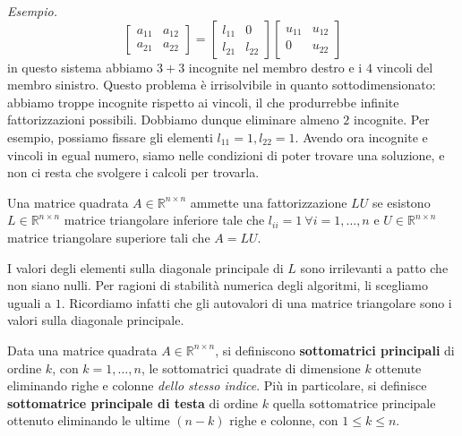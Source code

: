 \textit{Esempio.}
\begin{equation*}
\begin{bmatrix}
a_{11} & a_{12}\\
a_{21} & a_{22}
\end{bmatrix} =\begin{bmatrix}
l_{11} & 0\\
l_{21} & l_{22}
\end{bmatrix}\begin{bmatrix}
u_{11} & u_{12}\\
0 & u_{22}
\end{bmatrix}
\end{equation*}
in questo sistema abbiamo $\displaystyle 3+3$ incognite nel membro destro e i $\displaystyle 4$ vincoli del membro sinistro. Questo problema è irrisolvibile in quanto sottodimensionato: abbiamo troppe incognite rispetto ai vincoli, il che produrrebbe infinite fattorizzazioni possibili.
Dobbiamo dunque eliminare almeno $2$ incognite.
Per esempio, possiamo fissare gli elementi $\displaystyle l_{11} =1,l_{22} =1$.
Avendo ora incognite e vincoli in egual numero, siamo nelle condizioni di poter trovare una soluzione, e non ci resta che svolgere i calcoli per trovarla.
\begin{definition}
Una matrice quadrata $\displaystyle A\in \mathbb{R}^{n\times n}$ ammette una fattorizzazione $\displaystyle LU$ se esistono $\displaystyle L\in \mathbb{R}^{n\times n}$ matrice triangolare inferiore tale che $\displaystyle l_{ii} =1\ \forall i=1,\dotsc ,n$ e $\displaystyle U\in \mathbb{R}^{n\times n}$ matrice triangolare superiore tali che $\displaystyle A=LU$.
\end{definition}
I valori degli elementi sulla diagonale principale di $\displaystyle L$ sono irrilevanti a patto che non siano nulli.
Per ragioni di stabilità numerica degli algoritmi, li scegliamo uguali a $\displaystyle 1$.
Ricordiamo infatti che gli autovalori di una matrice triangolare sono i valori sulla diagonale principale.
\begin{definition}
Data una matrice quadrata $A \in \mathbb{R}^{n\times n}$, si definiscono \textbf{sottomatrici principali} di ordine $k$, con $k=1,\dots,n$, le sottomatrici quadrate di dimensione $k$ ottenute eliminando righe e colonne \emph{dello stesso indice}. Più in particolare, si definisce \textbf{sottomatrice principale di testa} di ordine $k$ quella sottomatrice principale ottenuto eliminando le ultime $(n-k)$ righe e colonne, con $1\le k\le n$.
\end{definition}
